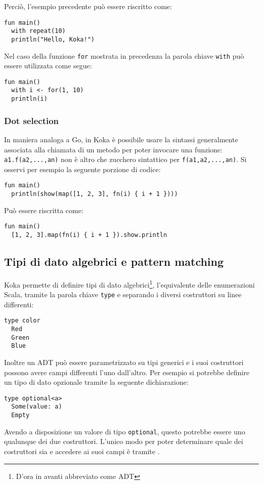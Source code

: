 Perciò, l'esempio precedente può essere riscritto come:
\begin{lstlisting}[language=koka]
fun main()
  with repeat(10)
  println("Hello, Koka!")
\end{lstlisting}

Nel caso della funzione \lstinline{for} mostrata in precedenza la parola chiave \lstinline{with} può essere utilizzata come segue:
\begin{lstlisting}[language=koka]
fun main()
  with i <- for(1, 10)
  println(i)
\end{lstlisting}

\subsubsection{Dot selection}
In maniera analoga a Go, in Koka è possibile usare la sintassi generalmente associata alla chiamata di un metodo per poter invocare una funzione: \lstinline{a1.f(a2,...,an)} non è altro che zucchero sintattico per \lstinline{f(a1,a2,...,an)}.
Si osservi per esempio la seguente porzione di codice:
\begin{lstlisting}[language=koka]
fun main()
  println(show(map([1, 2, 3], fn(i) { i + 1 })))
\end{lstlisting}
Può essere riscritta come:
\begin{lstlisting}[language=koka]
fun main()
  [1, 2, 3].map(fn(i) { i + 1 }).show.println
\end{lstlisting}

\subsection{Tipi di dato algebrici e pattern matching}
Koka permette di definire tipi di dato algebrici\footnote{D'ora in avanti abbreviato come ADT}, l'equivalente delle enumerazioni Scala, tramite la parola chiave \lstinline{type} e separando i diversi costruttori su linee differenti:
\begin{lstlisting}[language=koka]
type color
  Red
  Green
  Blue
\end{lstlisting}
Inoltre un ADT può essere parametrizzato su tipi generici e i suoi costruttori possono avere campi differenti l'uno dall'altro. Per esempio si potrebbe definire un tipo di dato opzionale tramite la seguente dichiarazione:
\begin{lstlisting}[language=koka]
type optional<a>
  Some(value: a)
  Empty
\end{lstlisting}
Avendo a disposizione un valore di tipo \lstinline{optional}, questo potrebbe essere uno qualunque dei due costruttori. L'unico modo per poter determinare quale dei costruttori sia e accedere ai suoi campi è tramite .

